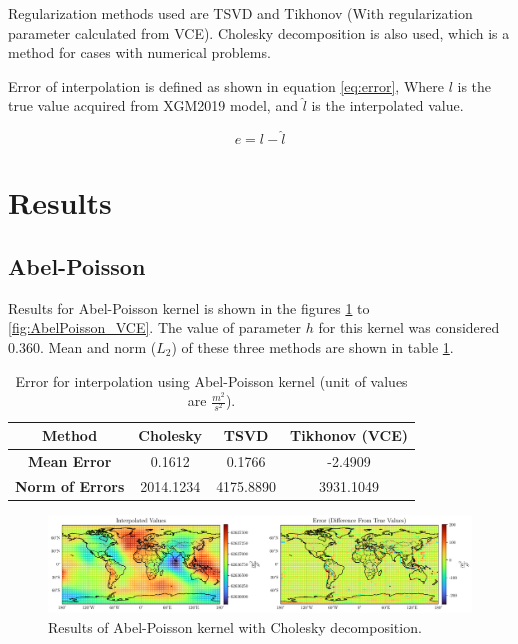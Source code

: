 \documentclass[12pt]{article}
\begin{document}
	Regularization methods used are TSVD and Tikhonov (With regularization parameter calculated from VCE). Cholesky decomposition is also used, which is a method for cases with numerical problems.
	
	Error of interpolation is defined as shown in equation \ref{eq:error}, Where $l$ is the true value acquired from XGM2019 model, and $\hat{l}$ is the interpolated value.
	
	\begin{equation}
		e = l - \hat{l}
		\label{eq:error}
	\end{equation}

	\section{Results}
	
	\subsection{Abel-Poisson}
	
	Results for Abel-Poisson kernel is shown in the figures \ref{fig:AbelPoisson_Chol} to \ref{fig:AbelPoisson_VCE}. The value of parameter $h$ for this kernel was considered 0.360. Mean and norm ($L_2$) of these three methods are shown in table \ref{tab:AbelPoisson_Error}.
	
	\begin{table}[h!]
		\centering
		\caption{Error for interpolation using Abel-Poisson kernel (unit of values are $\frac{m^2}{s^2}$).}
		\vspace{0.3cm}
		\renewcommand{\arraystretch}{1.4}
		\begin{tabular}{c|c|c|c}
			\textbf{Method} & Cholesky & TSVD & Tikhonov (VCE) \\
			\hline 
			\textbf{Mean Error} & 0.1612 & 0.1766 & -2.4909 \\
			\hline 
			\textbf{Norm of Errors} & 2014.1234 & 4175.8890 & 3931.1049 \\
		\end{tabular}
		\label{tab:AbelPoisson_Error}
	\end{table}
	
	\begin{figure}[h!]
		\centering
		\includegraphics[width=16cm]{../Outputs/AbelPoisson_Cholesky.pdf}
		\caption{Results of Abel-Poisson kernel with Cholesky decomposition.}
		\label{fig:AbelPoisson_Chol}
	\end{figure}
	
\end{document}
